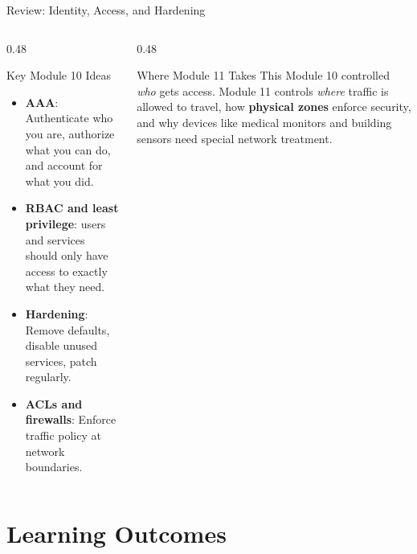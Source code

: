 \documentclass[aspectratio=169]{beamer}  %
\begin{document}
\begin{frame}{Review: Identity, Access, and Hardening}
    \begin{columns}[T]
        \begin{column}{0.48\textwidth}
            \begin{block}{Key Module 10 Ideas}
                \begin{itemize}
                    \item \textbf{AAA}: Authenticate who you are, authorize what you can do, and account for what you did.
                    \item \textbf{RBAC and least privilege}: users and services should only have access to exactly what they need.
                    \item \textbf{Hardening}: Remove defaults, disable unused services, patch regularly.
                    \item \textbf{ACLs and firewalls}: Enforce traffic policy at network boundaries.
                \end{itemize}
            \end{block}
        \end{column}
        \begin{column}{0.48\textwidth}
            \begin{alertblock}{Where Module 11 Takes This}
                Module 10 controlled \emph{who} gets access. Module 11 controls \emph{where} traffic is allowed to travel, how \textbf{physical zones} enforce security, and why devices like medical monitors and building sensors need special network treatment.
            \end{alertblock}
        \end{column}
    \end{columns}
\end{frame}

\section*{Learning Outcomes}
\end{document}
